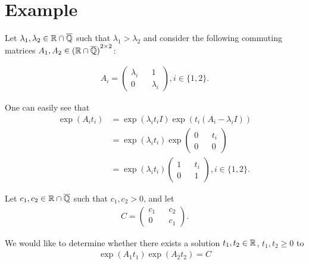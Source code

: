 \section{Example}

Let $\lambda_{1}, \lambda_{2} \in \mathbb{R} \cap \overline{\mathbb{Q}}$ such that $\lambda_{1} > \lambda_{2}$ and consider the following commuting matrices $A_{1}, A_{2} \in {(\mathbb{R}\cap \overline{\mathbb{Q}})}^{2 \times 2}$:

\begin{align*}
A_{i} = \begin{pmatrix} \lambda_{i} && 1 \\ 0 && \lambda_{i} \end{pmatrix}, i \in \lbrace 1, 2 \rbrace .
\end{align*}

One can easily see that
\begin{align*}
\exp(A_{i} t_{i}) &= \exp(\lambda_{i} t_{i} I) \exp(t_{i} (A_{i} - \lambda_{i} I)) \\
&= \exp(\lambda_{i} t_{i})
\exp \begin{pmatrix} 0 && t_{i} \\ 0 && 0 \end{pmatrix} \\
&= \exp (\lambda_{i} t_{i})
\begin{pmatrix} 1 && t_{i} \\ 0 && 1 \end{pmatrix}, i \in \lbrace 1, 2 \rbrace .
\end{align*}

Let $c_{1}, c_{2} \in \mathbb{R} \cap \overline{\mathbb{Q}}$ such that $c_{1}, c_{2} > 0$, and let
\begin{align*}
C = \begin{pmatrix} c_{1} && c_{2} \\ 0 && c_{1} \end{pmatrix} .
\end{align*}

We would like to determine whether there exists a solution $t_{1}, t_{2} \in \mathbb{R}$, $t_{1}, t_{2} \geq 0$ to
\begin{align*}
\exp(A_{1} t_{1}) \exp(A_{2} t_{2}) = C
\end{align*}

